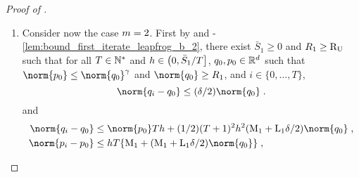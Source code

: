 \begin{proof}[Proof of ]
\begin{enumerate}[label=(\alph*),leftmargin=0cm,itemindent=0.5cm,labelwidth=1.2\itemindent,labelsep=0cm,align=left]
\begin{equation}
\end{equation}
We finally bound the two terms $C_{k,1}$ and $C_{k,2}$. First,
using the same reasoning as for $B_k$, we get that
\begin{equation}
\begin{aligned}
  &\limsup_{\norm{q_0} \to \plusinfty} \sup_{\norm{p_0} \leq \norm{q_0}^{\gamma}} \defEns{\abs{C_{k,1}}/\norm{q_0}^{4\m-6}} < \infty \eqsp, \\
  &\limsup_{\norm{q_0} \to \plusinfty} \sup_{\norm{p_0} \leq \norm{q_0}^{\gamma}} \defEns{\abs{C_{k,2}}/\norm{q_0}^{2\m-3+\gamma}} < \infty \eqsp.
\end{aligned}
\end{equation}
Arguing like in \eqref{eq:bound_A_k}, we get that
$\limsup_{\norm{q_0} \to \plusinfty}  \sup_{\norm{p_0} \leq \norm{q_0}^{\gamma}} \defEns{C_{k,3}/\norm{q_0}^{3\m-4}} < 0$.
Gathering all these results and  using that  $3m-4 \geq \max(4m-6,2m-3+\gamma)$ for $m \in \ooint{1,2}$ and $\gamma \in \ooint{0,m-1}$, we get that for all $k\in \{0, \ldots,T-1\}$,
\begin{equation}
  \limsup_{\norm{q_0} \to \plusinfty}  \sup_{\norm{p_0} \leq \norm{q_0}^{\gamma}} \defEns{\Ham(q_{k+1},p_{k+1})-\Ham(q_{k},p_{k})}/\norm{q_0}^{3m-4} < 0 \eqsp,
\end{equation}
which concludes the proof.
\item
  Consider now the case $m=2$.
First   by  and -\ref{lem:bound_first_iterate_leapfrog_b_2}, there exist $\bar{S}_1 \geq 0$ and  $R_1 \geq \operatorname{R_U}$ such that for all $T \in \mathbb{N}^{*}$ and $h \in \left(0,\bar{S}_1/T\right]$, $q_0,p_0 \in \mathbb{R}^d$ such that $ \norm{p_0} \leq
\norm{\q_0}^{\gamma}$ and $\norm{\q_0} \geq R_1$, and $i \in
\{0,\ldots,T\}$,
\begin{equation}\label{eq:bound_iterate_q_3_prood_diff_ham_3_0_2}
\norm{\q_{i}-\q_{0}}\leq (\delta/2) \norm{\q_0}  \eqsp.
\end{equation}
and
\begin{equation}
\label{eq:bound_iterate_q_3_prood_diff_ham_3_0_3}
\begin{aligned}
\norm{\q_{i}-\q_{0}}&\leq \norm{p_0} Th + (1/2) (T+1)^2 h^2 (\constzeroT + \constzero \delta/2) \norm{q_0}\eqsp, \\
 \norm{\p_i - \p_0} &\leq h T \{\constzeroT + (\constzeroT + \constzero \delta/2) \norm{q_0}  \} \eqsp,
\end{aligned}
\end{equation}

\end{enumerate}
\end{proof}
